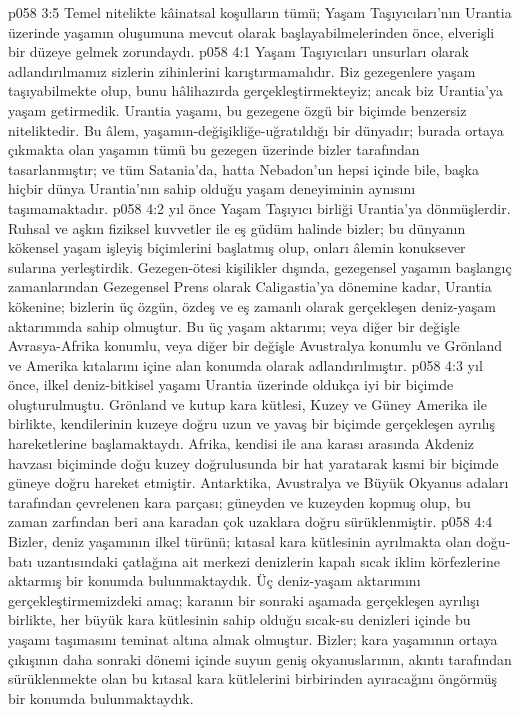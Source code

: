\vs p058 3:5 Temel nitelikte kâinatsal koşulların tümü; Yaşam Taşıyıcıları’nın Urantia üzerinde yaşamın oluşumuna mevcut olarak başlayabilmelerinden önce, elverişli bir düzeye gelmek zorundaydı.
\vs p058 4:1 Yaşam Taşıyıcıları unsurları olarak adlandırılmamız sizlerin zihinlerini karıştırmamalıdır. Biz gezegenlere yaşam taşıyabilmekte olup, bunu hâlihazırda gerçekleştirmekteyiz; ancak biz Urantia’ya yaşam getirmedik. Urantia yaşamı, bu gezegene özgü bir biçimde benzersiz niteliktedir. Bu âlem, yaşamın\hyp{}değişikliğe\hyp{}uğratıldığı bir dünyadır; burada ortaya çıkmakta olan yaşamın tümü bu gezegen üzerinde bizler tarafından tasarlanmıştır; ve tüm Satania’da, hatta Nebadon’un hepsi içinde bile, başka hiçbir dünya Urantia’nın sahip olduğu yaşam deneyiminin aynısını taşımamaktadır.
\vs p058 4:2  yıl önce Yaşam Taşıyıcı birliği Urantia’ya dönmüşlerdir. Ruhsal ve aşkın fiziksel kuvvetler ile eş güdüm halinde bizler; bu dünyanın kökensel yaşam işleyiş biçimlerini başlatmış olup, onları âlemin konuksever sularına yerleştirdik. Gezegen\hyp{}ötesi kişilikler dışında, gezegensel yaşamın başlangıç zamanlarından Gezegensel Prens olarak Caligastia’ya dönemine kadar, Urantia kökenine; bizlerin üç özgün, özdeş ve eş zamanlı olarak gerçekleşen deniz\hyp{}yaşam aktarımında sahip olmuştur. Bu üç yaşam aktarımı;  veya diğer bir değişle Avrasya\hyp{}Afrika konumlu,  veya diğer bir değişle Avustralya konumlu ve Grönland ve Amerika kıtalarını içine alan konumda  olarak adlandırılmıştır.
\vs p058 4:3  yıl önce, ilkel deniz\hyp{}bitkisel yaşamı Urantia üzerinde oldukça iyi bir biçimde oluşturulmuştu. Grönland ve kutup kara kütlesi, Kuzey ve Güney Amerika ile birlikte, kendilerinin kuzeye doğru uzun ve yavaş bir biçimde gerçekleşen ayrılış hareketlerine başlamaktaydı. Afrika, kendisi ile ana karası arasında Akdeniz havzası biçiminde doğu kuzey doğrulusunda bir hat yaratarak kısmi bir biçimde güneye doğru hareket etmiştir. Antarktika, Avustralya ve Büyük Okyanus adaları tarafından çevrelenen kara parçası; güneyden ve kuzeyden kopmuş olup, bu zaman zarfından beri ana karadan çok uzaklara doğru sürüklenmiştir.
\vs p058 4:4 Bizler, deniz yaşamının ilkel türünü; kıtasal kara kütlesinin ayrılmakta olan doğu\hyp{}batı uzantısındaki çatlağına ait merkezi denizlerin kapalı sıcak iklim körfezlerine aktarmış bir konumda bulunmaktaydık. Üç deniz\hyp{}yaşam aktarımını gerçekleştirmemizdeki amaç; karanın bir sonraki aşamada gerçekleşen ayrılışı birlikte, her büyük kara kütlesinin sahip olduğu sıcak\hyp{}su denizleri içinde bu yaşamı taşımasını teminat altına almak olmuştur. Bizler; kara yaşamının ortaya çıkışının daha sonraki dönemi içinde suyun geniş okyanuslarının, akıntı tarafından sürüklenmekte olan bu kıtasal kara kütlelerini birbirinden ayıracağını öngörmüş bir konumda bulunmaktaydık.
